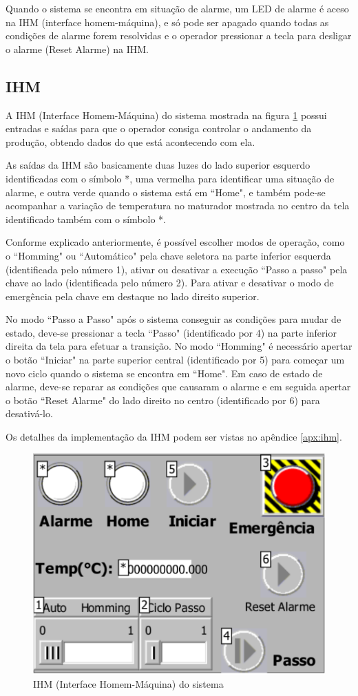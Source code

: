 \documentclass[twoside,twocolumn, 12pt]{paper}
\begin{document}
	Quando o sistema se encontra em situação de alarme, um LED de alarme é aceso na IHM (interface homem-máquina), e só pode ser apagado quando todas as condições de alarme forem resolvidas e o operador pressionar a tecla para desligar o alarme (Reset Alarme) na IHM.
	
	\subsection{IHM}
	A IHM (Interface Homem-Máquina) do sistema mostrada na figura \ref{fig:ihm} possui entradas e saídas para que o operador consiga controlar o andamento da produção, obtendo dados do que está acontecendo com ela. 
	
	As saídas da IHM são basicamente duas luzes do lado superior esquerdo identificadas com o símbolo *, uma vermelha para identificar uma situação de alarme, e outra verde quando o sistema está em ``Home", e também pode-se acompanhar a variação de temperatura no maturador mostrada no centro da tela identificado também com o símbolo *.
	
	Conforme explicado anteriormente, é possível escolher modos de operação, como o ``Homming" ou ``Automático" pela chave seletora na parte inferior esquerda (identificada pelo número 1), ativar ou desativar a execução ``Passo a passo" pela chave ao lado (identificada pelo número 2).	Para ativar e desativar o modo de emergência pela chave em destaque no lado direito superior.
	
	No modo ``Passo a Passo" após o sistema conseguir as condições para mudar de estado, deve-se pressionar a tecla ``Passo" (identificado por 4) na parte inferior direita da tela para efetuar a transição. No modo ``Homming" é necessário apertar o botão ``Iniciar" na parte superior central (identificado por 5) para começar um novo ciclo quando o sistema se encontra em ``Home". Em caso de estado de alarme, deve-se reparar as condições que causaram o alarme e em seguida apertar o botão ``Reset Alarme" do lado direito no centro (identificado por 6) para desativá-lo.
	
	Os detalhes da implementação da IHM podem ser vistas no apêndice \ref{apx:ihm}.
	
	\begin{figure}
		\centering
		\includegraphics [width=0.8\columnwidth]{ihmsmall.pdf}
		\caption{IHM (Interface Homem-Máquina) do sistema}
		\label{fig:ihm}
	\end{figure}
\end{document}

